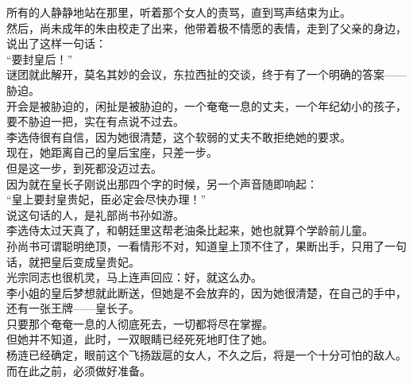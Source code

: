 \begin{multicols}{\theparacolNo}
所有的人静静地站在那里，听着那个女人的责骂，直到骂声结束为止。\\

然后，尚未成年的朱由校走了出来，他带着极不情愿的表情，走到了父亲的身边，说出了这样一句话：\\

“要封皇后！”\\

谜团就此解开，莫名其妙的会议，东拉西扯的交谈，终于有了一个明确的答案——胁迫。\\

开会是被胁迫的，闲扯是被胁迫的，一个奄奄一息的丈夫，一个年纪幼小的孩子，要不胁迫一把，实在有点说不过去。\\

李选侍很有自信，因为她很清楚，这个软弱的丈夫不敢拒绝她的要求。\\

现在，她距离自己的皇后宝座，只差一步。\\

但是这一步，到死都没迈过去。\\

因为就在皇长子刚说出那四个字的时候，另一个声音随即响起：\\

“皇上要封皇贵妃，臣必定会尽快办理！”\\

说这句话的人，是礼部尚书孙如游。\\

李选侍太过天真了，和朝廷里这帮老油条比起来，她也就算个学龄前儿童。\\

孙尚书可谓聪明绝顶，一看情形不对，知道皇上顶不住了，果断出手，只用了一句话，就把皇后变成皇贵妃。\\

光宗同志也很机灵，马上连声回应：好，就这么办。\\

李小姐的皇后梦想就此断送，但她是不会放弃的，因为她很清楚，在自己的手中，还有一张王牌——皇长子。\\

只要那个奄奄一息的人彻底死去，一切都将尽在掌握。\\

但她并不知道，此时，一双眼睛已经死死地盯住了她。\\

杨涟已经确定，眼前这个飞扬跋扈的女人，不久之后，将是一个十分可怕的敌人。而在此之前，必须做好准备。\\


\end{multicols}
